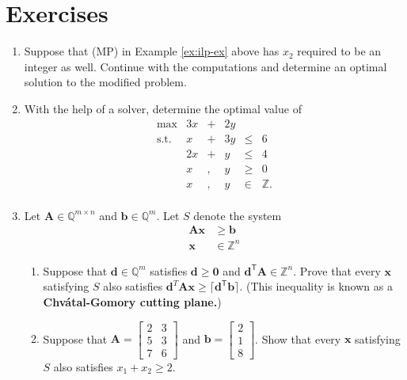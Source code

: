 \documentclass[]{book}
\newcommand{\ZZ}{\mathbb{Z}}
\newcommand{\QQ}{\mathbb{Q}}
\newcommand{\T}{\mathsf{T}}
\newcommand{\mm}[1]{\mathbf{#1}}
\renewcommand{\vec}[1]{\mathbf{#1}}
\theoremstyle{definition}
\theoremstyle{definition}
\theoremstyle{remark}
\begin{document}
\section*{Exercises}\label{exercises-10}

\begin{enumerate}
\def\labelenumi{\arabic{enumi}.}
\item
  Suppose that (MP) in Example \ref{ex:ilp-ex} above has \(x_2\)
  required to be an integer as well. Continue with the computations and
  determine an optimal solution to the modified problem.
\item
  With the help of a solver, determine the optimal value of
  \[\begin{array}{rrcrll}
  \max & 3x & + & 2y & \\
  \text{s.t.} 
  & x & + & 3y & \leq & 6 \\
  & 2x & +&  y & \leq & 4 \\
  & x & ,& y & \geq & 0 \\
  & x &,& y & \in  & \mathbb{Z}. \\
  \end{array}\]
\item
  Let \(\mm{A} \in \QQ^{m\times n}\) and \(\vec{b} \in \QQ^m\). Let
  \(S\) denote the system
  \begin{align*}
    \mm{A} \vec{x} & \geq \vec{b}\\
    \vec{x} & \in \ZZ^n
  \end{align*}

  \begin{enumerate}
  \def\labelenumii{\alph{enumii}.}
  \item
    Suppose that \(\vec{d} \in \QQ^m\) satisfies
    \(\vec{d} \geq \vec{0}\) and \(\vec{d}^\T\mm{A} \in \ZZ^n\). Prove
    that every \(\vec{x}\) satisfying \(S\) also satisfies
    \(\vec{d}^T\mm{A} \vec{x} \geq \lceil \vec{d}^\T\vec{b}\rceil\).
    (This inequality is known as a \textbf{Chvátal-Gomory cutting
    plane.})
  \item
    Suppose that
    \(\mm{A} = \begin{bmatrix} 2 & 3 \\ 5 & 3 \\ 7 & 6 \end{bmatrix}\)
    and \(\vec{b} = \begin{bmatrix} 2 \\ 1 \\ 8\end{bmatrix}\). Show
    that every \(\vec{x}\) satisfying \(S\) also satisfies
    \(x_1 + x_2 \geq 2\).
  \end{enumerate}
\end{enumerate}
\end{document}
